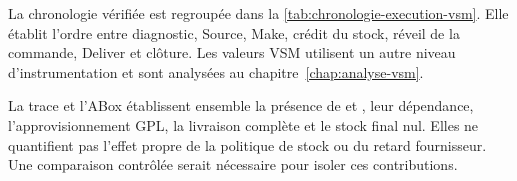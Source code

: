 La chronologie vérifiée est regroupée dans la \cref{tab:chronologie-execution-vsm}. Elle établit l'ordre entre diagnostic, Source, Make, crédit du stock, réveil de la commande, Deliver et clôture. Les valeurs VSM utilisent un autre niveau d'instrumentation et sont analysées au chapitre~\ref{chap:analyse-vsm}.

La trace et l'ABox établissent ensemble la présence de  et , leur dépendance, l'approvisionnement GPL, la livraison complète et le stock final nul. Elles ne quantifient pas l'effet propre de la politique de stock ou du retard fournisseur. Une comparaison contrôlée serait nécessaire pour isoler ces contributions.

